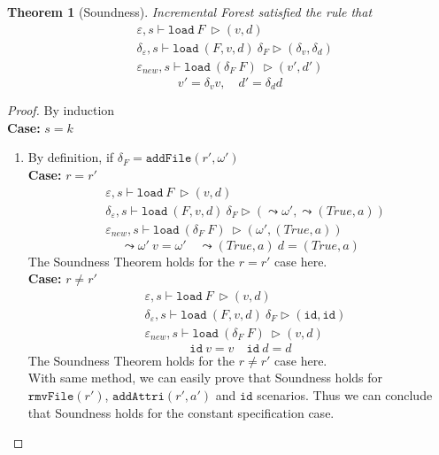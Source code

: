 \documentclass[10pt,twoside,a4paper]{article}
\theoremstyle{theorem}
\newtheorem{theorem}{Theorem}[section]
\theoremstyle{lemma}
\theoremstyle{property}
\theoremstyle{definition}
\theoremstyle{assumption}
\begin{document}
\begin{theorem}[Soundness]
	Incremental Forest satisfied the rule that
	\begin{align*}
		& \varepsilon, s \vdash \mathtt{load}~ F~ \rhd (v,d)\\
		& \delta_\varepsilon, s \vdash \mathtt{load}~ (F,v,d)~ \delta_F \rhd (\delta_v,\delta_d)\\
		& \varepsilon_{new}, s \vdash \mathtt{load}~ (\delta_F~F)~ \rhd (v',d')
	\end{align*}
	\begin{displaymath}
		v' = \delta_v v, \quad d' = \delta_d d
	\end{displaymath}
\end{theorem}

\begin{proof}
	By induction\\
	\textbf{Case: } $s = k$\\
	\begin{enumerate}
	\item
	By definition, if $\delta_F = \mathtt{addFile}(r',\omega')$ \\
	\textbf{Case: } $r = r'$
	\begin{align*}
			& \varepsilon, s \vdash \mathtt{load}~ F~ \rhd (v,d)\\
			& \delta_\varepsilon, s \vdash \mathtt{load}~ (F,v,d)~ \delta_F \rhd (\leadsto \omega', \leadsto (True, a))\\
			& \varepsilon_{new}, s \vdash \mathtt{load}~ (\delta_F~F)~ \rhd (\omega', (True, a))
	\end{align*}
	\begin{displaymath}
		\leadsto \omega' ~v = \omega' \quad \leadsto (True, a) ~d = (True, a)
	\end{displaymath}
	The Soundness Theorem holds for the $r = r'$ case here. \\
	\textbf{Case: } $r \not= r'$
	\begin{align*}
			& \varepsilon, s \vdash \mathtt{load}~ F~ \rhd (v,d)\\
			& \delta_\varepsilon, s \vdash \mathtt{load}~ (F,v,d)~ \delta_F \rhd (\mathtt{id}, \mathtt{id})\\
			& \varepsilon_{new}, s \vdash \mathtt{load}~ (\delta_F~F)~ \rhd (v,d)
	\end{align*}
	\begin{displaymath}
		\mathtt{id} ~v = v \quad \mathtt{id} ~d = d
	\end{displaymath}
	The Soundness Theorem holds for the $r \not= r'$ case here.\\
	With same method, we can easily prove that Soundness holds for $\mathtt{rmvFile}(r')$, $\mathtt{addAttri}(r', a')$ and $\mathtt{id}$ scenarios. Thus we can conclude that Soundness holds for the constant specification case.
	\end{enumerate}
	

\end{proof}
\end{document}
